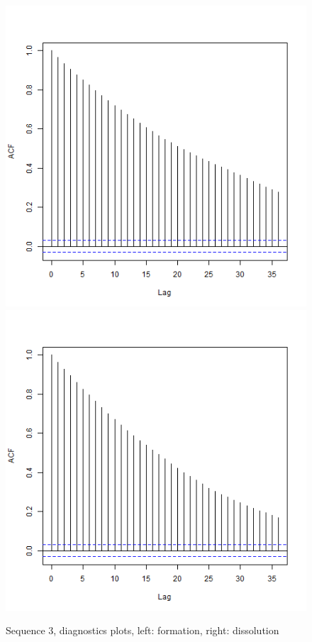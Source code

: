 \documentclass[a4paper, 11pt]{report}
\theoremstyle{definition}
\begin{document}
\begin{figure}[h]
\begin{center}
        \includegraphics[scale=0.395]{pictures/net3seq_chain1_BSTERGM_formation_acf.png}
        \includegraphics[scale=0.395]{pictures/net3seq_chain1_BSTERGM_dissolution_acf.png}
    \caption{Sequence 3, diagnostics plots, left: formation, right: dissolution}
    \end{center}
\end{figure}
\clearpage
\end{document}
